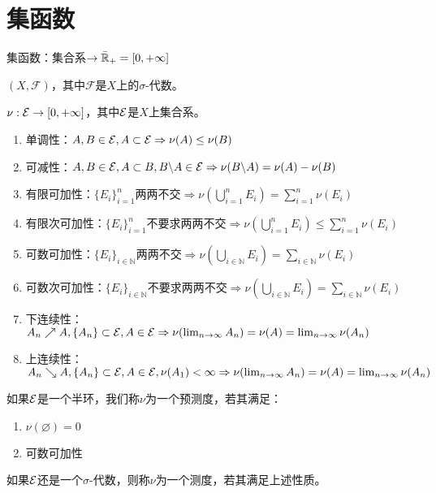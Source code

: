 \documentclass{ctexart}
\begin{document}
\section{集函数}
\begin{Def}
  集函数：集合系$\to \bar{\mathbb{R}}_{+}=[0,+\infty]$
\end{Def}

\begin{Def}[可测空间]
  $(X,\mathscr{F})$，其中$\mathscr{F}$是$X$上的$\sigma$-代数。
\end{Def}

\begin{Def}
  $\nu:\mathcal{E}\to [0,+\infty]$，其中$\mathcal{E}$是$X$上集合系。
  \begin{enumerate}
  \item 单调性：$A,B\in\mathcal{E},A\subset \mathcal{E}\Rightarrow \nu(A)\leq \nu(B)$
  \item 可减性：$A,B\in \mathcal{E},A\subset B,B\backslash A\in \mathcal{E}\Rightarrow \nu(B\backslash A)=\nu(A)-\nu(B)$
  \item 有限可加性：$\{E_{i}\}_{i=1}^{n}$两两不交$\Rightarrow \nu(\bigcup_{i=1}^{n}E_{i})=\sum_{i=1}^{n}\nu(E_{i})$
  \item 有限次可加性：$\{E_{i}\}_{i=1}^{n}$不要求两两不交$\Rightarrow \nu(\bigcup_{i=1}^{n}E_{i})\leq\sum_{i=1}^{n}\nu(E_{i})$
 
  \item 可数可加性：$\{E_{i}\}_{i\in\mathbb{N}}$两两不交$\Rightarrow \nu(\bigcup_{i\in\mathbb{N}}E_{i})=\sum_{i\in\mathbb{N}}\nu(E_{i})$
  \item 可数次可加性：$\{E_{i}\}_{i\in\mathbb{N}}$不要求两两不交$\Rightarrow \nu(\bigcup_{i\in\mathbb{N}}E_{i})=\sum_{i\in\mathbb{N}}\nu(E_{i})$
  \item 下连续性：$A_{n}\nearrow A,\{A_{n}\}\subset \mathcal{E},A\in\mathcal{E}\Rightarrow \nu(\lim_{n\to\infty} A_{n})=\nu(A)=\lim_{n\to\infty}\nu(A_{n})$
  \item 上连续性：$A_{n}\searrow A,\{A_{n}\}\subset \mathcal{E},A\in\mathcal{E},\nu(A_{1})<\infty\Rightarrow \nu(\lim_{n\to\infty} A_{n})=\nu(A)=\lim_{n\to\infty}\nu(A_{n})$
  \end{enumerate}
如果$\mathcal{E}$是一个半环，我们称$\nu$为一个预测度，若其满足：
\begin{enumerate}
\item $\nu(\varnothing)=0$
\item 可数可加性
\end{enumerate}
如果$\mathcal{E}$还是一个$\sigma$-代数，则称$\nu$为一个测度，若其满足上述性质。
\end{Def}
\end{document}
